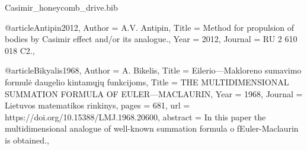 \documentclass[twoside, 10pt]{article}
\def\myfilename{Casimir_honeycomb_drive}
\begin{document}
\begin{multicols}{2}
\begin{filecontents}{\myfilename.bib}

@article{Antipin2012,
    Author = {A.V. Antipin},
    Title = {Method for propulsion of bodies by Casimir effect and/or its analogue.},
    Year = {2012},
    Journal = {RU 2 610 018 C2.},
}


@article{Bikyalis1968,
    Author = {A. Bikelis},
    Title = {Eilerio—Makloreno sumavimo formulė daugelio kintamųjų funkcijoms},
    Title = {THE MULTIDIMENSIONAL SUMMATION FORMULA OF EULER—MACLAURIN},
    Year = {1968},
    Journal = {Lietuvos matematikos rinkinys},
    pages = {681},
    url = {https://doi.org/10.15388/LMJ.1968.20600},
    abstract = {In this paper the multidimensional analogue of well-known summation formula o fEuler-Maclaurin is obtained.},
}



\end{filecontents}
\end{multicols}
\end{document}
